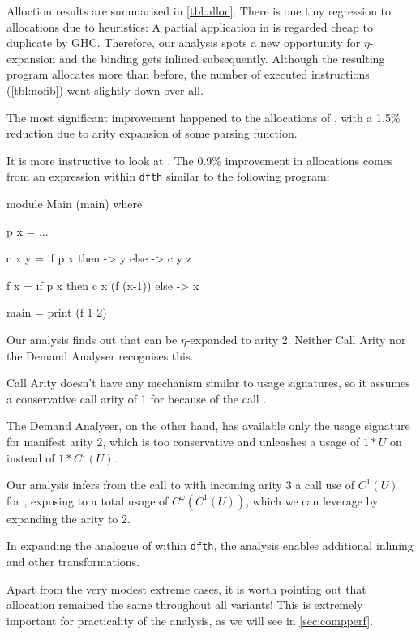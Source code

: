 Alloction results are summarised in \cref{tbl:alloc}.
There is one tiny regression to allocations due to heuristics:
A partial application in  is regarded cheap to duplicate by GHC.
Therefore, our analysis spots a new opportunity for $\eta$-expansion and the binding gets inlined subsequently.
Although the resulting program allocates more than before, the number of executed instructions (\cf \cref{tbl:nofib}) went slightly down over all.

The most significant improvement happened to the allocations of , with a 1.5\% reduction due to arity expansion of some parsing function.

It is more instructive to look at . 
The 0.9\% improvement in allocations comes from an expression within \texttt{dfth} similar to the following program:
\begin{haskellcode}
  module Main (main) where

  p x = ...

  c x y = 
    if p x 
    then \z -> y 
    else \z -> c y z
  
  f x = 
    if p x 
    then c x (f (x-1))
    else \z -> x

  main = 
    print (f 1 2)
\end{haskellcode}

Our analysis finds out that  can be $\eta$-expanded to arity 2.
Neither Call Arity nor the Demand Analyser recognises this.

Call Arity doesn't have any mechanism similar to usage signatures, so it assumes a conservative call arity of 1 for  because of the call .

The Demand Analyser, on the other hand, has available only the usage signature for manifest arity 2, which is too conservative and unleashes a usage of $1*U$ on  instead of $1*C^1(U)$.

Our analysis infers from the call to  with incoming arity 3 a call use of $C^1(U)$ for , exposing  to a total usage of $C^\omega(C^1(U))$, which we can leverage by expanding the arity to 2.

In expanding the analogue of  within \texttt{dfth}, the analysis enables additional inlining and other transformations.
\smallskip

Apart from the very modest extreme cases, it is worth pointing out that allocation remained the same throughout all variants!
This is extremely important for practicality of the analysis, as we will see in \cref{sec:compperf}.

